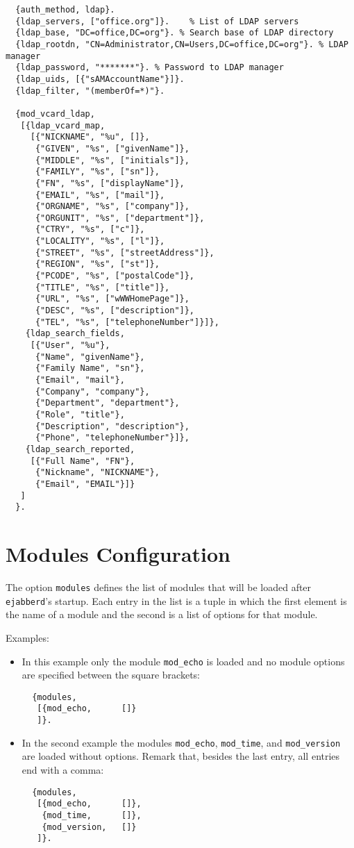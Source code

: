\documentclass[a4paper,10pt]{article}
\newcommand{\ind}[1]{\begin{latexonly}\index{#1}\end{latexonly}}
\newcommand{\term}[1]{\texttt{#1}}
\newcommand{\ejabberd}{\texttt{ejabberd}}
\newcommand{\module}[1]{\texttt{#1}}
\newcommand{\modecho}{\module{mod\_echo}}
\newcommand{\modtime}{\module{mod\_time}}
\newcommand{\modversion}{\module{mod\_version}}
\begin{document}
\begin{verbatim}
  {auth_method, ldap}.
  {ldap_servers, ["office.org"]}.    % List of LDAP servers
  {ldap_base, "DC=office,DC=org"}. % Search base of LDAP directory
  {ldap_rootdn, "CN=Administrator,CN=Users,DC=office,DC=org"}. % LDAP manager
  {ldap_password, "*******"}. % Password to LDAP manager
  {ldap_uids, [{"sAMAccountName"}]}.
  {ldap_filter, "(memberOf=*)"}.

  {mod_vcard_ldap,
   [{ldap_vcard_map,
     [{"NICKNAME", "%u", []},
      {"GIVEN", "%s", ["givenName"]},
      {"MIDDLE", "%s", ["initials"]},
      {"FAMILY", "%s", ["sn"]},
      {"FN", "%s", ["displayName"]},
      {"EMAIL", "%s", ["mail"]},
      {"ORGNAME", "%s", ["company"]},
      {"ORGUNIT", "%s", ["department"]},
      {"CTRY", "%s", ["c"]},
      {"LOCALITY", "%s", ["l"]},
      {"STREET", "%s", ["streetAddress"]},
      {"REGION", "%s", ["st"]},
      {"PCODE", "%s", ["postalCode"]},
      {"TITLE", "%s", ["title"]},
      {"URL", "%s", ["wWWHomePage"]},
      {"DESC", "%s", ["description"]},
      {"TEL", "%s", ["telephoneNumber"]}]},
    {ldap_search_fields,
     [{"User", "%u"},
      {"Name", "givenName"},
      {"Family Name", "sn"},
      {"Email", "mail"},
      {"Company", "company"},
      {"Department", "department"},
      {"Role", "title"},
      {"Description", "description"},
      {"Phone", "telephoneNumber"}]},
    {ldap_search_reported,
     [{"Full Name", "FN"},
      {"Nickname", "NICKNAME"},
      {"Email", "EMAIL"}]}
   ]
  }.
\end{verbatim}


\section{Modules Configuration}
\label{modules}
\ind{modules}

The option \term{modules} defines the list of modules that will be loaded after
\ejabberd{}'s startup. Each entry in the list is a tuple in which the first
element is the name of a module and the second is a list of options for that
module.

Examples:
\begin{itemize}
\item In this example only the module \modecho{} is loaded and no module
  options are specified between the square brackets:
  \begin{verbatim}
  {modules,
   [{mod_echo,      []}
   ]}.
\end{verbatim}
\item In the second example the modules \modecho{}, \modtime{}, and
  \modversion{} are loaded without options. Remark that, besides the last entry,
  all entries end with a comma:
  \begin{verbatim}
  {modules,
   [{mod_echo,      []},
    {mod_time,      []},
    {mod_version,   []}
   ]}.
\end{verbatim}
\end{itemize}
\end{document}
